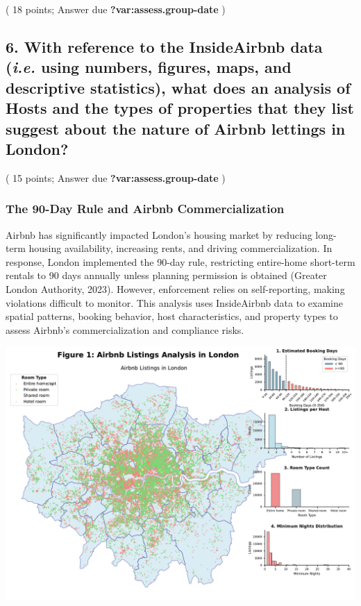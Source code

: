 \documentclass[
  a4paper,
  DIV=11,
  numbers=noendperiod]{scrartcl}
\begin{document}
( 18 points; Answer due \textbf{?var:assess.group-date} )

\subsection{\texorpdfstring{6. With reference to the InsideAirbnb data
(\emph{i.e.} using numbers, figures, maps, and descriptive statistics),
what does an analysis of Hosts and the types of properties that they
list suggest about the nature of Airbnb lettings in
London?}{6. With reference to the InsideAirbnb data (i.e. using numbers, figures, maps, and descriptive statistics), what does an analysis of Hosts and the types of properties that they list suggest about the nature of Airbnb lettings in London?}}\label{with-reference-to-the-insideairbnb-data-i.e.-using-numbers-figures-maps-and-descriptive-statistics-what-does-an-analysis-of-hosts-and-the-types-of-properties-that-they-list-suggest-about-the-nature-of-airbnb-lettings-in-london}

( 15 points; Answer due \textbf{?var:assess.group-date} )

\subsubsection{The 90-Day Rule and Airbnb
Commercialization}\label{the-90-day-rule-and-airbnb-commercialization}

Airbnb has significantly impacted London's housing market by reducing
long-term housing availability, increasing rents, and driving
commercialization. In response, London implemented the 90-day rule,
restricting entire-home short-term rentals to 90 days annually unless
planning permission is obtained (Greater London Authority, 2023).
However, enforcement relies on self-reporting, making violations
difficult to monitor. This analysis uses InsideAirbnb data to examine
spatial patterns, booking behavior, host characteristics, and property
types to assess Airbnb's commercialization and compliance risks.

\includegraphics{0013_Group_Work_files/figure-pdf/cell-7-output-1.pdf}
\end{document}
